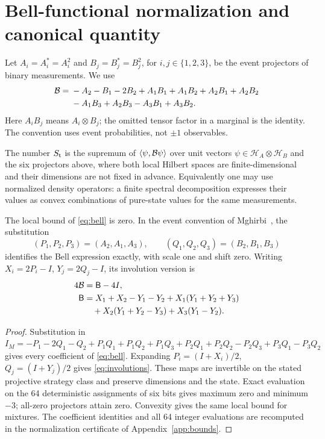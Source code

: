 \section{Bell-functional normalization and canonical quantity}\label{sec:normalization}
Let \(A_i=A_i^*=A_i^2\) and \(B_j=B_j^*=B_j^2\), for
\(i,j\in\{1,2,3\}\), be the event projectors of binary measurements. We use
\begin{equation}\label{eq:bell}
\begin{split}
\mathcal B={}&-A_2-B_1-2B_2
 +A_1B_1+A_1B_2+A_2B_1+A_2B_2\\
 &-A_1B_3+A_2B_3-A_3B_1+A_3B_2.
\end{split}
\end{equation}
Here \(A_iB_j\) means \(A_i\otimes B_j\); the omitted tensor factor in a
marginal is the identity. The convention uses event probabilities, not
\(\pm1\) observables.

\begin{definition}\label{def:St}
The number \(S_{\mathrm t}\) is the supremum of
\(\langle\psi,\mathcal B\psi\rangle\) over unit vectors
\(\psi\in\mathcal H_A\otimes\mathcal H_B\) and the six projectors above,
where both local Hilbert spaces are finite-dimensional and their dimensions
are not fixed in advance. Equivalently one may use normalized density
operators: a finite spectral decomposition expresses their values as convex
combinations of pure-state values for the same measurements.
\end{definition}

\begin{proposition}\label{prop:normalization}
The local bound of \eqref{eq:bell} is zero. In the event convention of
Mghirbi~\cite{Mghirbi2026paper}, the substitution
\[
 (P_1,P_2,P_3)=(A_2,A_1,A_3),\qquad
 (Q_1,Q_2,Q_3)=(B_2,B_1,B_3)
\]
identifies the Bell expression exactly, with scale one and shift zero.
Writing \(X_i=2P_i-I\), \(Y_j=2Q_j-I\), its involution version is
\begin{align}
 4\mathcal B&=\mathsf B-4I,\label{eq:involutions}\\
 \mathsf B&=X_1+X_2-Y_1-Y_2+X_1(Y_1+Y_2+Y_3)\notag\\
 &\quad+X_2(Y_1+Y_2-Y_3)+X_3(Y_1-Y_2).\notag
\end{align}
\end{proposition}
\begin{proof}
Substitution in
\(I_M=-P_1-2Q_1-Q_2+P_1Q_1+P_1Q_2+P_1Q_3+
P_2Q_1+P_2Q_2-P_2Q_3+P_3Q_1-P_3Q_2\)
gives every coefficient of \eqref{eq:bell}. Expanding
\(P_i=(I+X_i)/2\), \(Q_j=(I+Y_j)/2\) gives
\eqref{eq:involutions}. These maps are invertible on the stated projective
strategy class and preserve dimensions and the state. Exact evaluation on
the 64 deterministic assignments of six bits gives maximum zero and minimum
\(-3\); all-zero projectors attain zero. Convexity gives the same local bound
for mixtures. The coefficient identities and all 64 integer evaluations are
recomputed in the normalization certificate of Appendix~\ref{app:bounds}.
\end{proof}

